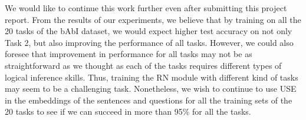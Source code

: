 \documentclass{article}
\begin{document}
We would like to continue this work further even after submitting this project report. From the results of our experiments, we believe that by training on all the 20 tasks of the bAbI dataset, we would expect higher test accuracy on not only Task 2, but also improving the performance of all tasks. However, we could also foresee that improvement in performance for all tasks may not be as straightforward as we thought as each of the tasks requires different types of logical inference skills. Thus, training the RN module with different kind of tasks may seem to be a challenging task. Nonetheless, we wish to continue to use USE in the embeddings of the sentences and questions for all the training sets of the 20 tasks to see if we can succeed in more than 95\% for all the tasks.

%






\end{document}
